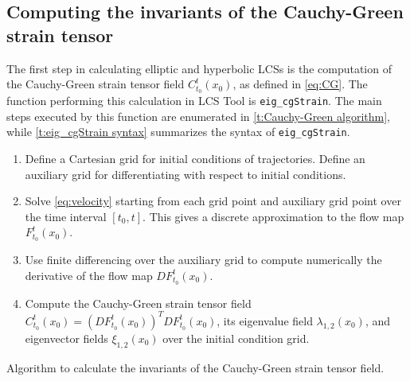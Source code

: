\documentclass[5p]{elsarticle}
\begin{document}
\subsection{Computing the invariants of the Cauchy-Green strain tensor}

The first step in calculating elliptic and hyperbolic LCSs is the computation of the Cauchy-Green strain tensor field $C_{t_0}^t(x_0)$, as defined in \cref{eq:CG}. The function performing this calculation in LCS Tool is \lstinline!eig_cgStrain!. The main steps executed by this function are enumerated in \cref{t:Cauchy-Green algorithm}, while \cref{t:eig_cgStrain syntax} summarizes the syntax of \lstinline!eig_cgStrain!.

\begin{table}
\begin{enumerate}
\item Define a Cartesian grid for initial conditions of trajectories. Define an auxiliary grid for differentiating with respect to initial conditions.
\item Solve \cref{eq:velocity} starting from each grid point and auxiliary grid point over the time interval $[t_0,t]$. This gives a discrete approximation to the flow map $F_{t_0}^t(x_0)$.
\item Use finite differencing over the auxiliary grid to compute numerically the derivative of the flow map $DF_{t_0}^t(x_0)$.
\item Compute the Cauchy-Green strain tensor field $C_{t_0}^t(x_0) = \left(DF_{t_0}^t(x_0)\right)^T DF_{t_0}^t(x_0)$, its eigenvalue field $\lambda_{1,2}(x_0)$, and eigenvector fields $\xi_{1,2}(x_0)$ over the initial condition grid.
\end{enumerate}
\caption{Algorithm to calculate the invariants of the Cauchy-Green strain tensor field.}
\label{t:Cauchy-Green algorithm}
\end{table}
\end{document}
